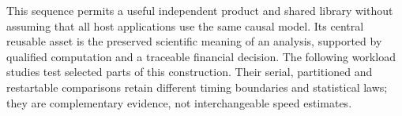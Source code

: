 This sequence permits a useful independent product and shared library
without assuming that all host applications use the same causal model.
Its central reusable asset is the preserved scientific meaning of an
analysis, supported by qualified computation and a traceable financial
decision. The following workload studies test selected parts of this construction. Their serial, partitioned and restartable comparisons retain different timing boundaries and statistical laws; they are complementary evidence, not interchangeable speed estimates.




